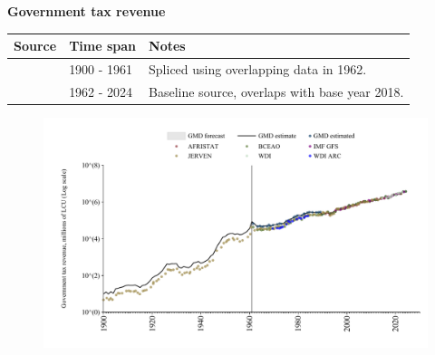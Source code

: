 \documentclass[12pt,a4paper,landscape]{article}
\begin{document}
\begin{adjustbox}{max totalsize={\paperwidth}{\paperheight},center}
\begin{minipage}[t][\textheight][t]{\textwidth}
\vspace*{0.5cm}
{}
\begin{center}
{\Large\bfseries Government tax revenue}
\end{center}
\vspace{0.5cm}
\begin{table}[H]
\centering
\small
\begin{tabular}{|l|l|l|}
\hline
\textbf{Source} & \textbf{Time span} & \textbf{Notes} \\
\hline
\rowcolor{white}\cite{JERVEN}& 1900 - 1961 &Spliced using overlapping data in 1962. \\
\rowcolor{lightgray}\cite{GMD_estimated}& 1962 - 2024 &Baseline source, overlaps with base year 2018. \\
\hline
\end{tabular}
\end{table}
\begin{figure}[H]
\centering
\includegraphics[width=\textwidth,height=0.6\textheight,keepaspectratio]{graphs/SEN_govtax.pdf}
\end{figure}
\end{minipage}
\end{adjustbox}
\end{document}
